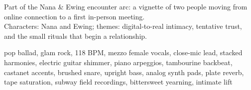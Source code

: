 

\begin{notes}
Part of the Nana \& Ewing encounter arc: a vignette of two people moving from online connection to a first in-person meeting.\\
Characters: Nana and Ewing; themes: digital-to-real intimacy, tentative trust, and the small rituals that begin a relationship.
\end{notes}

\begin{style}
pop ballad, glam rock, 118 BPM, mezzo female vocals, close-mic lead, stacked harmonies, electric guitar shimmer, piano arpeggios, tambourine backbeat, castanet accents, brushed snare, upright bass, analog synth pads, plate reverb, tape saturation, subway field recordings, bittersweet yearning, intimate lift
\end{style}

